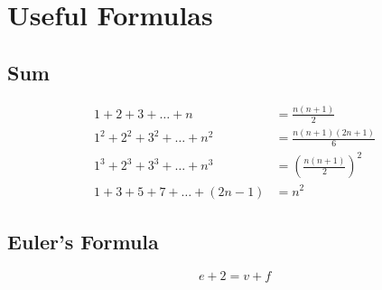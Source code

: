 \documentclass[a4paper, 12pt]{article}
\begin{document}
\section*{Useful Formulas}
\subsection*{Sum}
\begin{align*}
	1 + 2 + 3 + \ldots + n &= \frac{n(n+1)}{2}\\
	1^2 + 2^2 + 3^2 + \ldots + n^2 &= \frac{n(n+1)(2n+1)}{6}\\
	1^3 + 2^3 + 3^3 + \ldots + n^3 &= \left(\frac{n(n+1)}{2}\right)^2\\
	1+3 + 5 + 7 + \ldots + (2n-1) &= n^2
\end{align*}

\subsection*{Euler's Formula}
\[
e+2 = v+f
\]
\end{document}
